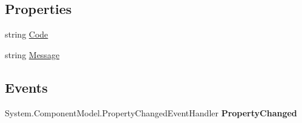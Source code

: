 \subsection*{Properties}
\begin{DoxyCompactItemize}
\item 
\hypertarget{class_price___comparison_1_1amazon_1_1ecs_1_1_errors_error_a42fdba1b88704b6b881736ac8251821b}{string \hyperlink{class_price___comparison_1_1amazon_1_1ecs_1_1_errors_error_a42fdba1b88704b6b881736ac8251821b}{Code}}\label{class_price___comparison_1_1amazon_1_1ecs_1_1_errors_error_a42fdba1b88704b6b881736ac8251821b}

\begin{DoxyCompactList}\small\item\em \end{DoxyCompactList}\item 
\hypertarget{class_price___comparison_1_1amazon_1_1ecs_1_1_errors_error_aed14b7c5b540d53d0d179195001e3c2b}{string \hyperlink{class_price___comparison_1_1amazon_1_1ecs_1_1_errors_error_aed14b7c5b540d53d0d179195001e3c2b}{Message}}\label{class_price___comparison_1_1amazon_1_1ecs_1_1_errors_error_aed14b7c5b540d53d0d179195001e3c2b}

\begin{DoxyCompactList}\small\item\em \end{DoxyCompactList}\end{DoxyCompactItemize}
\subsection*{Events}
\begin{DoxyCompactItemize}
\item 
\hypertarget{class_price___comparison_1_1amazon_1_1ecs_1_1_errors_error_a491c039fded2c58446c02d2cc9f4203b}{System.\-Component\-Model.\-Property\-Changed\-Event\-Handler {\bfseries Property\-Changed}}\label{class_price___comparison_1_1amazon_1_1ecs_1_1_errors_error_a491c039fded2c58446c02d2cc9f4203b}

\end{DoxyCompactItemize}
